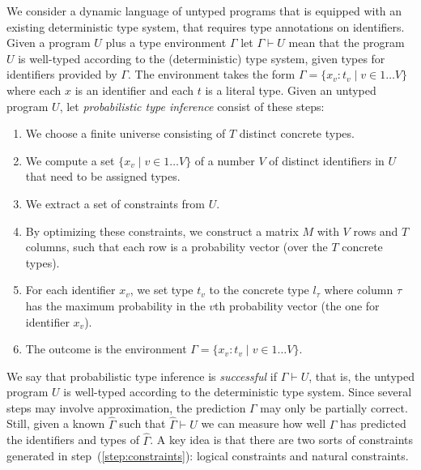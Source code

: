 \documentclass[sigplan,10pt,review,anonymous]{acmart}
\theoremstyle{plain}
\theoremstyle{remark}
\theoremstyle{definition}
\begin{document}
We consider a dynamic language of untyped programs that is equipped with an existing deterministic type system, that requires type annotations on identifiers.
%
Given a program $U$ plus a type environment $\Gamma$ let $\Gamma \vdash U$ mean that the program $U$ is well-typed according to the (deterministic) type system, given types for identifiers provided by $\Gamma$.
%
 
The environment takes the form $\Gamma = \{ x_v : t_v \mid v \in 1 \ldots V\}$ where each $x$ is an identifier and each $t$ is a literal type.
%
Given an untyped program $U$,
let \emph{probabilistic type inference} consist of these steps:
\begin{enumerate}
    \item We choose a finite universe consisting of $T$ distinct concrete types.
    \item We compute a set $\{ x_v \mid v \in 1 \ldots V\}$ of a number $V$ of distinct identifiers in $U$ that need to be assigned types.
    \item \label{step:constraints} We extract a set of constraints from $U$.
    \item \label{step:optimize} By optimizing these constraints, we construct a matrix $M$ with $V$ rows and $T$ columns, such that each row is a probability vector (over the $T$ concrete types).
    \item For each identifier $x_v$, we set type $t_v$ to the concrete type $l_\tau$ where column $\tau$ has the maximum probability in the $v$th probability vector (the one for identifier $x_v$).
    \item The outcome is the environment $\Gamma = \{ x_v : t_v \mid v \in 1 \ldots V\}$.
\end{enumerate}

We say that probabilistic type inference is \emph{successful} if $\Gamma \vdash U$, that is, the untyped program $U$ is well-typed according to the deterministic type system.
%
Since several steps may involve approximation, the prediction $\Gamma$ may only be partially correct.
%
Still, given a known $\hat{\Gamma}$ such that $\hat{\Gamma} \vdash U$ we can measure how well $\Gamma$ has predicted the identifiers and types of $\hat{\Gamma}$.
%
A key idea is that there are two sorts of constraints generated in step~(\ref{step:constraints}): logical constraints and natural 
constraints. 
\end{document}
